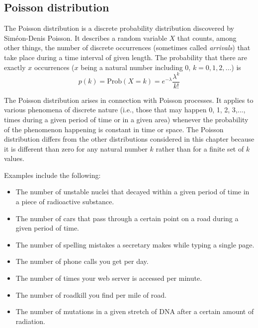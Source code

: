 \documentclass[justified,sixbynine]{tufte-book}
\theoremstyle{plain}%
\theoremstyle{definition}
\theoremstyle{remark}
\begin{document}
\begin{fullwidth}
\goodbreak\subsection{Poisson distribution}


The Poisson distribution is a discrete probability distribution discovered
by Sim\'{e}on-Denis Poisson. It describes a random variable
$X$ that counts, among other things, the number of
discrete occurrences (sometimes called {\it arrivals}) that take place during
a time interval of given length. The probability that there are exactly $x$
occurrences ($x$ being a natural number including 0, $k=0,1,2,...$) is
\begin{equation}
p(k)=\textrm{Prob}(X=k)=e^{-\lambda }\frac{\lambda ^k}{k!}
\end{equation}

The Poisson distribution arises in connection with Poisson processes. It
applies to various phenomena of discrete nature (i.e., those that may
happen 0, 1, 2, 3,..., times during a given period of time or in a given
area) whenever the probability of the phenomenon happening is constant in
time or space. The Poisson distribution differs from the other distributions
considered in this chapter because it is different than zero for any natural
number $k$ rather than for a finite set of $k$ values.

Examples include the following:

\begin{itemize}
\item  The number of unstable nuclei that decayed within a given period of
time in a piece of radioactive substance.

\item  The number of cars that pass through a certain point on a road during
a given period of time.

\item  The number of spelling mistakes a secretary makes while typing a
single page.

\item  The number of phone calls you get per day.

\item  The number of times your web server is accessed per minute.

\item  The number of roadkill you find per mile of road.

\item  The number of mutations in a given stretch of DNA after a certain
amount of radiation.


\end{itemize}
\end{fullwidth}
\end{document}
